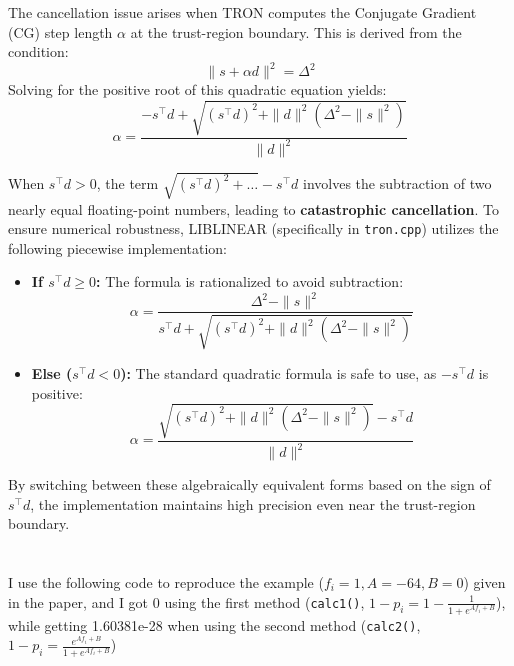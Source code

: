 \documentclass[12pt]{article}
\title{\mytitle}
\author{\textbf{\myauthor}}
\date{}
\begin{document}
\maketitle

\section{}

The cancellation issue arises when TRON computes the Conjugate Gradient (CG) step length $\alpha$ at the trust-region boundary. This is derived from the condition:
\begin{equation}
\|s + \alpha d\|^2 = \Delta^2
\end{equation}
Solving for the positive root of this quadratic equation yields:
\begin{equation}
\alpha = \frac{-s^\top d + \sqrt{(s^\top d)^2 + \|d\|^2(\Delta^2 - \|s\|^2)}}{\|d\|^2}
\end{equation}

When $s^\top d > 0$, the term $\sqrt{(s^\top d)^2 + \dots} - s^\top d$ involves the subtraction of two nearly equal floating-point numbers, leading to \textbf{catastrophic cancellation}. To ensure numerical robustness, LIBLINEAR (specifically in \texttt{tron.cpp}) utilizes the following piecewise implementation:

\begin{itemize}
    \item \textbf{If $s^\top d \geq 0$:} The formula is rationalized to avoid subtraction:
    \begin{equation}
    \alpha = \frac{\Delta^2 - \|s\|^2}{s^\top d + \sqrt{(s^\top d)^2 + \|d\|^2(\Delta^2 - \|s\|^2)}}
    \end{equation}
    
    \item \textbf{Else ($s^\top d < 0$):} The standard quadratic formula is safe to use, as $-s^\top d$ is positive:
    \begin{equation}
    \alpha = \frac{\sqrt{(s^\top d)^2 + \|d\|^2(\Delta^2 - \|s\|^2)} - s^\top d}{\|d\|^2}
    \end{equation}
\end{itemize}

By switching between these algebraically equivalent forms based on the sign of $s^\top d$, the implementation maintains high precision even near the trust-region boundary.

\newpage
\section{}
I use the following code to reproduce the example ($f_i=1,A=-64,B=0$) given in the paper, and I got $0$ using the first method (\texttt{calc1()}, $1-p_i=1-\frac{1}{1+e^{Af_i+B}}$), while getting 1.60381e-28 when using the second method (\texttt{calc2()}, $1-p_i=\frac{e^{Af_i+B}}{1+e^{Af_i+B}}$)
\end{document}
